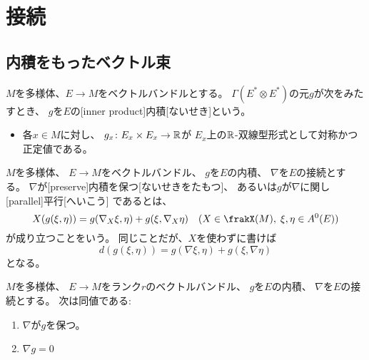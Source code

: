 \documentclass[report]{jlreq}
\begin{document}
\tableofcontents
\markboth{\contentsname}{}

%
\newpage
\setcounter{chapter}{1}
\chapter{接続}

%
\setcounter{section}{2}
\section{内積をもったベクトル束}

\begin{definition}[ベクトルバンドルの内積]
    $M$を多様体、$E \to M$をベクトルバンドルとする。
    $\Gamma(E^* \otimes E^*)$の元$g$が次をみたすとき、
    $g$を$E$の[inner product]{内積}[ないせき]という。
    \begin{itemize}
        \item 各$x \in M$に対し、
            $g_x \colon E_x \times E_x \to \mathbb{R}$が
            $E_x$上の$\mathbb{R}$-双線型形式として対称かつ正定値である。
    \end{itemize}
\end{definition}

\begin{definition}[内積を保つ接続]
    $M$を多様体、
    $E \to M$をベクトルバンドル、
    $g$を$E$の内積、
    $\nabla$を$E$の接続とする。
    $\nabla$が[preserve]{内積を保つ}[ないせきをたもつ]、
    あるいは$g$が$\nabla$に関し
    [parallel]{平行}[へいこう]
    であるとは、
    \begin{equation}
        X(g(\xi, \eta)) = g(\nabla_X\xi, \eta) + g(\xi, \nabla_X\eta)
        \quad (X \in \frakX(M), \; \xi, \eta \in A^0(E))
    \end{equation}
    が成り立つことをいう。
    同じことだが、$X$を使わずに書けば
    \begin{equation}
        d(g(\xi, \eta)) = g(\nabla\xi, \eta) + g(\xi, \nabla\eta)
    \end{equation}
    となる。
\end{definition}

\begin{proposition}[内積を保つ接続の特徴付け]
    $M$を多様体、
    $E \to M$をランク$r$のベクトルバンドル、
    $g$を$E$の内積、
    $\nabla$を$E$の接続とする。
    次は同値である:
    \begin{enumerate}
        \item $\nabla$が$g$を保つ。
        \item $\nabla g = 0$
    \end{enumerate}
\end{proposition}
\end{document}
